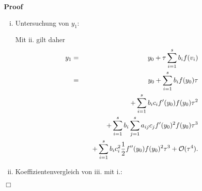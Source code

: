 \documentclass{book}
\newenvironment{enumerateroman}{\begin{enumerate}[i.] }{\end{enumerate}}
\newenvironment{proof}{\noindent\textbf{Proof\ }}{\hspace*{\fill}$\Box$\medskip}
\begin{document}
\begin{proof}
\begin{enumerateroman}
\begin{eqnarray*}
      \sum_{j = 1}^s a_{i j} (f (y_0) +\mathcal{O} (\tau)) \right)^2
      +\mathcal{O} (\tau^3)\\
      & = & f (y_0) + f' (y_0) \sum_{j = 1}^s a_{i j} f (y_0) \tau + f' (y_0)
      \sum_{j = 1}^s a_{i j} f' (y_0) \sum_{l = 1}^s a_{j l} f (y_0) \tau^2\\
      &  & \text{{\hspace{2.7em}}} + \frac{1}{2} f'' (y_0) \left( \sum_{j =
      1}^s a_{i j} f (y_0) \right)^2 \tau^2 +\mathcal{O} (\tau^3) .
    \end{eqnarray*}
    {\hspace{1.7em}}Beachte $c_i = \sum_{j = 1}^s a_{i j}$ bzw. $c_j = \sum_{l
    = 1}^s a_{j l}$, und somit
    \begin{eqnarray*}
      f (v_i) & = & f (y_0) + f' (y_0) \sum_{j = 1}^s a_{i j} f (y_0) \tau +
      f' (y_0) \sum_{j = 1}^s a_{i j} f' (y_0) \sum_{l = 1}^s a_{j l} f (y_0)
      \tau^2\\
      &  & \text{{\hspace{2.7em}}} + \frac{1}{2} f'' (y_0) \left( \sum_{j =
      1}^s a_{i j} f (y_0) \right)^2 \tau^2 +\mathcal{O} (\tau^3)\\
      & = & f (y_0) + f' (y_0) c_i f (y_0) \tau + f' (y_0) \sum_{j = 1}^s
      a_{i j} f' (y_0) c_j f (y_0) \tau^2\\
      &  & \text{{\hspace{2.7em}}} + \frac{1}{2} f'' (y_0) (c_i f (y_0))^2
      \tau^2 +\mathcal{O} (\tau^3)\\
      & = & f (y_0) + c_i f' (y_0) f (y_0) \tau\\
      &  & \text{{\hspace{2.7em}}} + \sum_{j = 1}^s a_{i j} c_j f' (y_0)^2 f
      (y_0) \tau^2\\
      &  & \text{{\hspace{2.7em}}} + c_i^2  \frac{1}{2} f'' (y_0) f (y_0)^2
      \tau^2 +\mathcal{O} (\tau^3) .
    \end{eqnarray*}
    \item Untersuchung von $y_1$:
    
    Mit ii. gilt daher
    \begin{eqnarray*}
      y_1 & = & y_0 + \tau \sum_{i = 1}^s b_i f (v_i)\\
      & = & y_0 + \sum_{i = 1}^s b_i f (y_0) \tau\\
      &  & \text{\quad$+ \sum_{i = 1}^s b_i$} c_i f' (y_0) f (y_0) \tau^2\\
      &  & \text{\quad$+ \sum_{i = 1}^s b_i$}  \sum_{j = 1}^s a_{i j} c_j f'
      (y_0)^2 f (y_0) \tau^3\\
      &  & \text{\quad$+ \sum_{i = 1}^s b_i$} c_i^2  \frac{1}{2} f'' (y_0) f
      (y_0)^2 \tau^3 +\mathcal{O} (\tau^4) .
    \end{eqnarray*}
    \item Koeffizientenvergleich von iii. mit i.:
    

\end{enumerateroman}
\end{proof}
\end{document}
